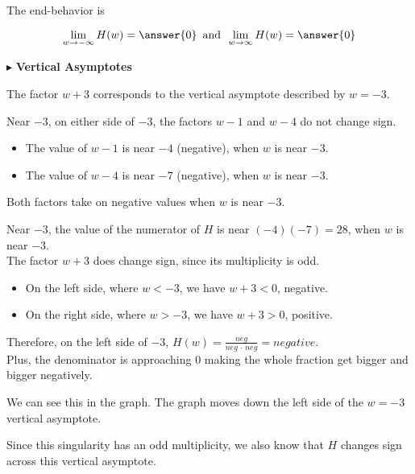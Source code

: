 \documentclass{ximera}
\begin{document}
\begin{example}
The end-behavior is



\[       \lim_{w \to -\infty} H(w) = \answer{0}   \, \text{ and } \,    \lim_{w \to \infty} H(w) = \answer{0}               \]





$\blacktriangleright$ \textbf{Vertical Asymptotes} 





The factor $w+3$ corresponds to the vertical asymptote described by $w = -3$.


Near $-3$, on either side of $-3$, the factors $w-1$ and $w-4$ do not change sign. 



\begin{itemize}
\item The value of $w-1$ is near $-4$ (negative), when $w$ is near $-3$.
\item The value of $w-4$ is near $-7$ (negative), when $w$ is near $-3$.
\end{itemize}

Both factors take on negative values when $w$ is near $-3$.  

Near $-3$, the value of the numerator of $H$ is near $(-4)(-7) = 28$, when $w$ is near $-3$.  \\





The factor $w+3$ does change sign, since its multiplicity is odd.

\begin{itemize}
\item On the left side, where $w < -3$, we have $w+3<0$, negative.
\item On the right side, where $w > -3$, we have $w+3>0$, positive.
\end{itemize}


Therefore, on the left side of $-3$, $H(w) = \frac{neg}{neg \, \cdot \, neg} = negative$.  \\

Plus, the denominator is approaching $0$ making the whole fraction get bigger and bigger negatively.

We can see this in the graph.  The graph moves down the left side of the $w=-3$ vertical asymptote.

Since this singularity has an odd multiplicity, we also know that $H$ changes sign across this vertical asymptote.



\end{example}
\end{document}
